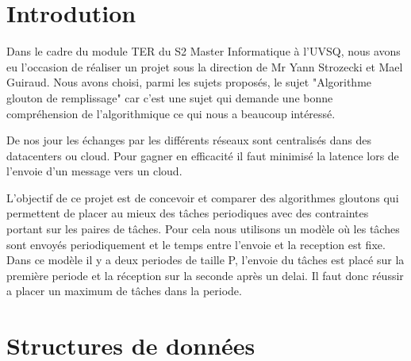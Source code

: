 \documentclass[11pt]{article}
\title{\vspace{13em}{\huge TER}}
\author{Rémi Navarro - 21401257\\ Edouard Fouassier - 21400750}
\begin{document}
\clearpage
\maketitle\vspace{13em}
\newpage
\tableofcontents
\newpage
\clearpage
{}

\section{Introdution}
Dans le cadre du module TER du S2 Master Informatique à l’UVSQ, nous avons eu l’occasion de réaliser un projet sous la direction de Mr Yann Strozecki et Mael Guiraud.
Nous avons choisi, parmi les sujets proposés, le sujet "Algorithme glouton de remplissage" car c'est une sujet qui demande une bonne compréhension de l'algorithmique ce qui nous a beaucoup intéressé.

De nos jour les échanges par les différents réseaux sont centralisés dans des datacenters ou cloud.
Pour gagner en efficacité il faut minimisé la latence lors de l'envoie d'un message vers un cloud.

L'objectif de ce projet est de concevoir et comparer des algorithmes gloutons qui permettent de placer au mieux des tâches periodiques avec des contraintes portant sur les paires de tâches.
Pour cela nous utilisons un modèle où les tâches sont envoyés periodiquement et le temps entre l'envoie et la reception est fixe.
Dans ce modèle il y a deux periodes de taille P, l'envoie du tâches est placé sur la première periode et la réception sur la seconde après un delai.
Il faut donc réussir a placer un maximum de tâches dans la periode.

\section{Structures de données}
\end{document}
